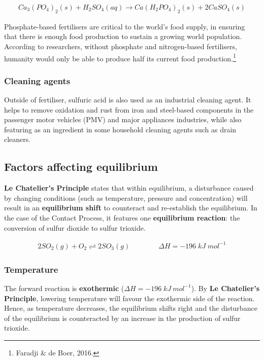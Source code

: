 \documentclass[12pt, a4paper]{article}
\begin{document}
\begin{align}
	Ca_{3}(PO_{4})_{2}(s) + H_{2}SO_{4}(aq) \rightarrow Ca(H_{2}PO_{4})_{2}(s) + 2CaSO_{4}(s)
\end{align}

Phosphate-based fertilisers are critical to the world's food supply, in ensuring that there is enough food production to sustain a growing world population. According to researchers, without phosphate and nitrogen-based fertilisers, humanity would only be able to produce half its current food production.\footnote{Faradji \& de Boer, 2016.}

\subsubsection{Cleaning agents}
Outside of fertiliser, sulfuric acid is also used as an industrial cleaning agent. It helps to remove oxidation and rust from iron and steel-based components in the passenger motor vehicles (PMV) and major appliances industries, while also featuring as an ingredient in some household cleaning agents such as drain cleaners.






\subsection{Factors affecting equilibrium}

\textbf{Le Chatelier's Principle} states that within equilibrium, a disturbance caused by changing conditions (such as temperature, pressure and concentration) will result in an \textbf{equilibrium shift} to counteract and re-establish the equilibrium. In the case of the Contact Process, it features one \textbf{equilibrium reaction}: the conversion of sulfur dioxide to sulfur trioxide.

\begin{align}
	2SO_{2}(g) + O_{2} \rightleftharpoons 2SO_{3}(g) \qquad \qquad \Delta H = -196 \; kJ \; mol^{-1}
\end{align}






\subsubsection{Temperature}

The forward reaction is \textbf{exothermic} (\(\Delta H = -196 \; kJ \: mol^{-1}\)). By \textbf{Le Chatelier's Principle}, lowering temperature will favour the exothermic side of the reaction. Hence, as temperature decreases, the equilibrium shifts right and the disturbance of the equilibrium is counteracted by an increase in the production of sulfur trioxide. 
\end{document}
